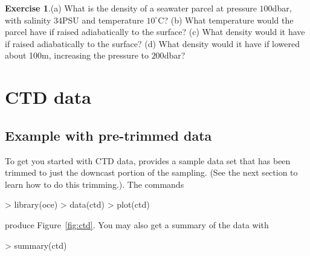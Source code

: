 \documentclass{article}
\newcommand{\workedexercise}[2]{
	\vspace{1ex}
	\begin{boxedminipage}[c]{0.95\linewidth}
		{\textbf{Exercise #1}.\hspace{1em}#2}
	\end{boxedminipage}
	\vspace{1ex}
}
\begin{document}
\workedexercise{1}{(a) What is the density of a seawater parcel at pressure
$100$dbar, with salinity $34$PSU and temperature $10^\circ$C?
(b) What temperature would the parcel have if raised adiabatically to the surface?
(c) What density would it have if raised adiabatically to the surface?
(d) What density would it have if lowered about 100m, increasing the pressure to $200$dbar?}


\section{CTD data}
\subsection{Example with pre-trimmed data}

To get you started with CTD data, \verb@oce@ provides a sample data set that has been trimmed to just the downcast portion of the sampling.  (See the next section to learn how to do this trimming.).  The commands
\begin{Schunk}
\begin{Sinput}
> library(oce)
> data(ctd)
> plot(ctd)
\end{Sinput}
\end{Schunk}
produce Figure~\ref{fig:ctd}. You may also get a summary of the data with
\begin{Schunk}
\begin{Sinput}
> summary(ctd)
\end{Sinput}
\end{Schunk}
\end{document}
